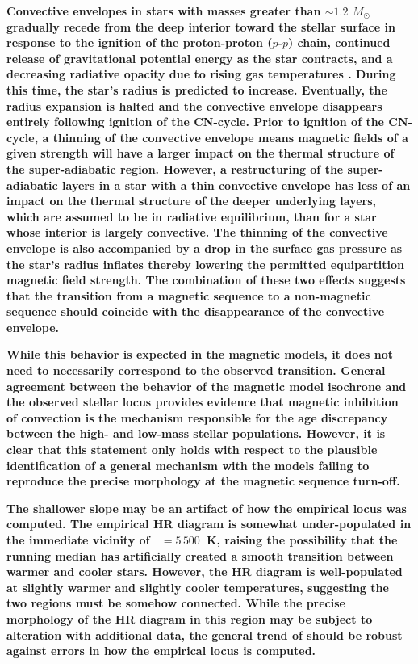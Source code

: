 \documentclass{aa}
\begin{document}
{\bf %
Convective envelopes in stars with masses greater than $\sim1.2$ $M_{\odot}$ gradually recede from the deep interior toward the stellar surface in response to the ignition of the proton-proton ($p$-$p$) chain, continued release of gravitational potential energy as the star contracts, and a decreasing radiative opacity due to rising gas temperatures \citep{Henyey1955}. During this time, the star's radius is predicted to increase. Eventually, the radius expansion is halted and the convective envelope disappears entirely following ignition of the CN-cycle. Prior to ignition of the CN-cycle, a thinning of the convective envelope means magnetic fields of a given strength will have a larger impact on the thermal structure of the super-adiabatic region. However, a restructuring of the super-adiabatic layers in a star with a thin convective envelope has less of an impact on the thermal structure of the deeper underlying layers, which are assumed to be in radiative equilibrium, than for a star whose interior is largely convective. The thinning of the convective envelope is also accompanied by a drop in the surface gas pressure as the star's radius inflates thereby lowering the permitted equipartition magnetic field strength. The combination of these two effects suggests that the transition from a magnetic sequence to a non-magnetic sequence should coincide with the disappearance of the convective envelope.} %

{\bf While this behavior is expected in the magnetic models, it does not need to necessarily correspond to the observed transition. General agreement between the behavior of the magnetic model isochrone and the observed stellar locus provides evidence that magnetic inhibition of convection is the mechanism responsible for the age discrepancy between the high- and low-mass stellar populations. However, it is clear that this statement only holds with respect to the plausible identification of a general mechanism with the models failing to reproduce the precise morphology at the magnetic sequence turn-off.}

{\bf The shallower slope may be an artifact of how the empirical locus was computed. The empirical HR diagram is somewhat under-populated in the immediate vicinity of \teff~$= 5\,500$~K, raising the possibility that the running median has artificially created a smooth transition between warmer and cooler stars. However, the HR diagram is well-populated at slightly warmer and slightly cooler temperatures, suggesting the two regions must be somehow connected. While the precise morphology of the HR diagram in this region may be subject to alteration with additional data, the general trend of should be robust against errors in how the empirical locus is computed.}
\end{document}
